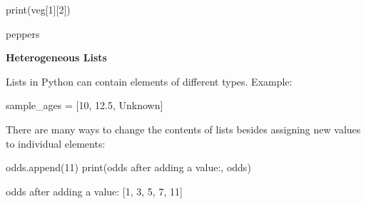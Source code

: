 \documentclass[
  letterpaper,
  DIV=11,
  numbers=noendperiod]{scrartcl}
\newenvironment{Shaded}{\begin{snugshade}}{\end{snugshade}}
\newcommand{\BuiltInTok}[1]{\textcolor[rgb]{0.00,0.23,0.31}{#1}}
\newcommand{\DecValTok}[1]{\textcolor[rgb]{0.68,0.00,0.00}{#1}}
\newcommand{\FloatTok}[1]{\textcolor[rgb]{0.68,0.00,0.00}{#1}}
\newcommand{\NormalTok}[1]{\textcolor[rgb]{0.00,0.23,0.31}{#1}}
\newcommand{\OperatorTok}[1]{\textcolor[rgb]{0.37,0.37,0.37}{#1}}
\newcommand{\StringTok}[1]{\textcolor[rgb]{0.13,0.47,0.30}{#1}}
\theoremstyle{remark}
\begin{document}
\begin{tcolorbox}[enhanced jigsaw, bottomrule=.15mm, rightrule=.15mm, colback=white, colframe=quarto-callout-color-frame, leftrule=.75mm, arc=.35mm, breakable, toprule=.15mm, left=2mm, opacityback=0]
\begin{Shaded}
\begin{Highlighting}[]
\BuiltInTok{print}\NormalTok{(veg[}\DecValTok{1}\NormalTok{][}\DecValTok{2}\NormalTok{])}
\end{Highlighting}
\end{Shaded}

\begin{Shaded}
\begin{Highlighting}[]
\NormalTok{\textquotesingle{}peppers\textquotesingle{}}
\end{Highlighting}
\end{Shaded}

\end{tcolorbox}

\begin{tcolorbox}[enhanced jigsaw, bottomrule=.15mm, rightrule=.15mm, colback=white, colframe=quarto-callout-color-frame, leftrule=.75mm, arc=.35mm, breakable, toprule=.15mm, left=2mm, opacityback=0]

\vspace{-3mm}\textbf{Heterogeneous Lists}\vspace{3mm}

Lists in Python can contain elements of different types. Example:

\begin{Shaded}
\begin{Highlighting}[]
\NormalTok{sample\_ages }\OperatorTok{=}\NormalTok{ [}\DecValTok{10}\NormalTok{, }\FloatTok{12.5}\NormalTok{, }\StringTok{\textquotesingle{}Unknown\textquotesingle{}}\NormalTok{]}
\end{Highlighting}
\end{Shaded}

\end{tcolorbox}

There are many ways to change the contents of lists besides assigning
new values to individual elements:

\begin{Shaded}
\begin{Highlighting}[]
\NormalTok{odds.append(}\DecValTok{11}\NormalTok{)}
\BuiltInTok{print}\NormalTok{(}\StringTok{\textquotesingle{}odds after adding a value:\textquotesingle{}}\NormalTok{, odds)}
\end{Highlighting}
\end{Shaded}

\begin{Shaded}
\begin{Highlighting}[]
\NormalTok{odds after adding a value: [1, 3, 5, 7, 11]}
\end{Highlighting}
\end{Shaded}
\end{document}
